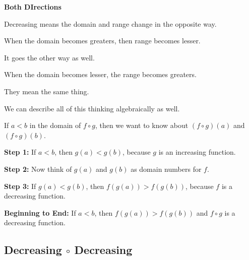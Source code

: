 \documentclass{ximera}
\begin{document}
\begin{warning} \textbf{\textcolor{red!70!black}{Both DIrections}}

Decreasing means the domain and range change in the opposite way.

When the domain becomes greaters, then range becomes lesser.

It goes the other way as well.

When the domain becomes lesser, the range becomes greaters.

They mean the same thing.


\end{warning}






We can describe all of this thinking algebraically as well. 


If $a < b$ in the domain of $f \circ g$, then we want to know about $(f \circ g)(a)$  and $(f \circ g)(b)$.



\textbf{Step 1:}  If $a < b$, then $g(a) < g(b)$, because $g$ is an increasing function.


\textbf{Step 2:}  Now think of $g(a)$ and $g(b)$ as domain numbers for $f$.


\textbf{Step 3:}  If $g(a) < g(b)$, then $f(g(a)) > f(g(b))$, because $f$ is a decreasing function.


\textbf{Beginning to End:} If $a < b$, then $f(g(a)) > f(g(b))$ and $f \circ g$ is a decreasing function.














































\subsection*{Decreasing $\circ$ Decreasing}
\end{document}
